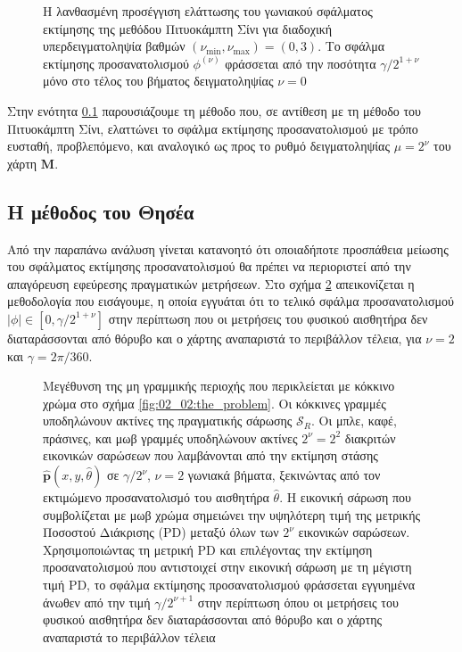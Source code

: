 \begin{figure}[!h]\centering
  
  \caption{\small Η λανθασμένη προσέγγιση ελάττωσης του γωνιακού σφάλματος
           εκτίμησης της μεθόδου Πιτυοκάμπτη Σίνι για διαδοχική
           υπερδειγματοληψία βαθμών $(\nu_{\min}, \nu_{\max}) = (0,3)$. Το
           σφάλμα εκτίμησης προσανατολισμού $\phi^{(\nu)}$ φράσσεται από την
           ποσότητα $\gamma/2^{1+\nu}$ μόνο στο τέλος του βήματος
           δειγματοληψίας $\nu=0$}
  \label{fig:02_04_02:sinis}
\end{figure}

Στην ενότητα \ref{subsection:02_04_02:06} παρουσιάζουμε τη μέθοδο που, σε
αντίθεση με τη μέθοδο του Πιτυοκάμπτη Σίνι, ελαττώνει το σφάλμα εκτίμησης
προσανατολισμού με τρόπο ευσταθή, προβλεπόμενο, και αναλογικό ως προς το ρυθμό
δειγματοληψίας $\mu = 2^{\nu}$ του χάρτη $\bm{M}$.

\subsection{Η μέθοδος του Θησέα}
\label{subsection:02_04_02:06}

Από την παραπάνω ανάλυση γίνεται κατανοητό ότι οποιαδήποτε προσπάθεια
μείωσης του σφάλματος εκτίμησης προσανατολισμού θα πρέπει να περιοριστεί από
την απαγόρευση εφεύρεσης πραγματικών μετρήσεων. Στο σχήμα
\ref{fig:oversampling_correct} απεικονίζεται η μεθοδολογία που εισάγουμε, η
οποία εγγυάται ότι το τελικό σφάλμα προσανατολισμού $|\phi| \in [0,\gamma /
2^{1+\nu}]$ στην περίπτωση που οι μετρήσεις του φυσικού αισθητήρα δεν
διαταράσσονται από θόρυβο και ο χάρτης αναπαριστά το περιβάλλον τέλεια, για
$\nu = 2$ και $\gamma = 2\pi/360$.

\begin{figure}[!h]\centering
  
  \caption{\small Μεγέθυνση της μη γραμμικής περιοχής που περικλείεται με
           κόκκινο χρώμα στο σχήμα \ref{fig:02_02:the_problem}. Οι κόκκινες
           γραμμές υποδηλώνουν ακτίνες της πραγματικής σάρωσης $\mathcal{S}_R$.
           Οι μπλε, καφέ, πράσινες, και μωβ γραμμές υποδηλώνουν
           ακτίνες $2^\nu = 2^2$ διακριτών εικονικών σαρώσεων που λαμβάνονται
           από την εκτίμηση στάσης $\hat{\bm{p}}(x,y,\hat{\theta})$ σε
           $\gamma/2^\nu$, $\nu = 2$ γωνιακά βήματα, ξεκινώντας από τον
           εκτιμώμενο προσανατολισμό του αισθητήρα $\hat{\theta}$. Η εικονική
           σάρωση που συμβολίζεται με μωβ χρώμα σημειώνει την υψηλότερη τιμή
           της μετρικής Ποσοστού Διάκρισης (PD) μεταξύ όλων των $2^\nu$
           εικονικών σαρώσεων. Χρησιμοποιώντας τη μετρική PD και επιλέγοντας
           την εκτίμηση προσανατολισμού που αντιστοιχεί στην εικονική σάρωση με
           τη μέγιστη τιμή PD, το σφάλμα εκτίμησης προσανατολισμού φράσσεται
           εγγυημένα άνωθεν από την τιμή $\gamma/2^{\nu+1}$ στην περίπτωση
           όπου οι μετρήσεις του φυσικού αισθητήρα δεν διαταράσσονται από
           θόρυβο και ο χάρτης αναπαριστά το περιβάλλον τέλεια}
  \label{fig:oversampling_correct}
\end{figure}

